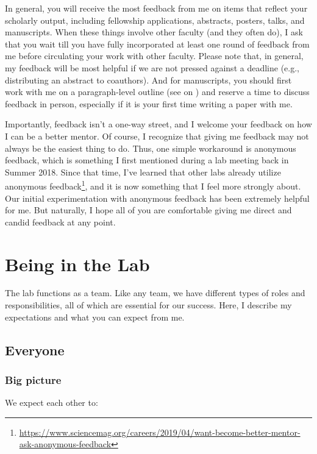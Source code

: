 \documentclass[letterpaper,11pt,oneside]{memoir}
\begin{document}
In general, you will receive the most feedback from me on items that reflect your scholarly output, including fellowship applications, abstracts, posters, talks, and manuscripts. When these things involve other faculty (and they often do), I ask that you wait till you have fully incorporated at least one round of feedback from me before circulating your work with other faculty. Please note that, in general, my feedback will be most helpful if we are not pressed against a deadline (e.g., distributing an abstract to coauthors). And for manuscripts, you should first work with me on a paragraph-level outline (see  on ) and reserve a time to discuss feedback in person, especially if it is your first time writing a paper with me.

Importantly, feedback isn't a one-way street, and I welcome your feedback on how I can be a better mentor. Of course, I recognize that giving me feedback may not always be the easiest thing to do. Thus, one simple workaround is anonymous feedback, which is something I first mentioned during a lab meeting back in Summer 2018. Since that time, I've learned that other labs already utilize anonymous feedback\footnote{\url{https://www.sciencemag.org/careers/2019/04/want-become-better-mentor-ask-anonymous-feedback}}, and it is now something that I feel more strongly about. Our initial experimentation with anonymous feedback has been extremely helpful for me. But naturally, I hope all of you are comfortable giving me direct and candid feedback at any point.


\chapter{Being in the Lab}

The lab functions as a team. Like any team, we have different types of roles and responsibilities, all of which are essential for our success. Here, I describe my expectations and what you can expect from me. 

\section{Everyone}

\subsection{Big picture}

We expect each other to:
\end{document}
